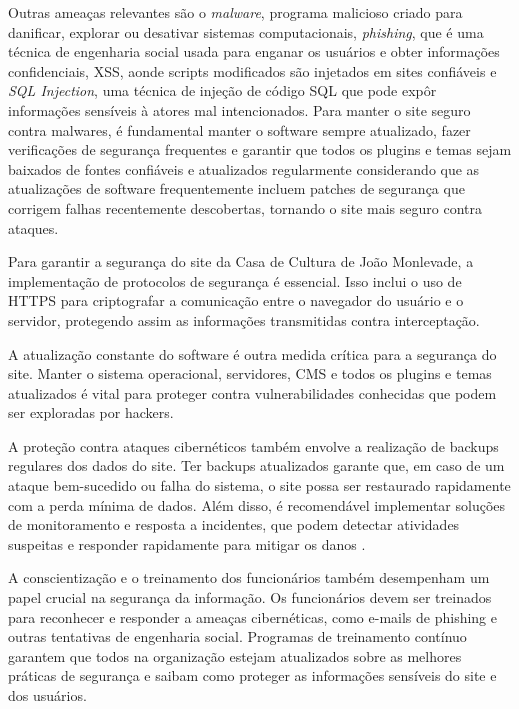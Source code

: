 Outras ameaças relevantes são o \textit{malware}, programa malicioso criado para danificar, explorar ou desativar sistemas computacionais, \textit{phishing}, que é uma técnica de engenharia social usada para enganar os usuários e obter informações confidenciais, \ac{XSS}, aonde scripts modificados são injetados em sites confiáveis e \textit{SQL Injection}, uma técnica de injeção de código \ac{SQL} que pode expôr informações sensíveis à atores mal intencionados. Para manter o site seguro contra malwares, é fundamental manter o software sempre atualizado, fazer verificações de segurança frequentes e garantir que todos os plugins e temas sejam baixados de fontes confiáveis e atualizados regularmente considerando que as atualizações de software frequentemente incluem patches de segurança que corrigem falhas recentemente descobertas, tornando o site mais seguro contra ataques.

Para garantir a segurança do site da Casa de Cultura de João Monlevade, a implementação de protocolos de segurança é essencial. Isso inclui o uso de \ac{HTTPS} para criptografar a comunicação entre o navegador do usuário e o servidor, protegendo assim as informações transmitidas contra interceptação. 

A atualização constante do software é outra medida crítica para a segurança do site. Manter o sistema operacional, servidores, \ac{CMS} e todos os plugins e temas atualizados é vital para proteger contra vulnerabilidades conhecidas que podem ser exploradas por hackers. 

A proteção contra ataques cibernéticos também envolve a realização de backups regulares dos dados do site. Ter backups atualizados garante que, em caso de um ataque bem-sucedido ou falha do sistema, o site possa ser restaurado rapidamente com a perda mínima de dados. Além disso, é recomendável implementar soluções de monitoramento e resposta a incidentes, que podem detectar atividades suspeitas e responder rapidamente para mitigar os danos \cite{baykara2018overview}.

A conscientização e o treinamento dos funcionários também desempenham um papel crucial na segurança da informação. Os funcionários devem ser treinados para reconhecer e responder a ameaças cibernéticas, como e-mails de phishing e outras tentativas de engenharia social. Programas de treinamento contínuo garantem que todos na organização estejam atualizados sobre as melhores práticas de segurança e saibam como proteger as informações sensíveis do site e dos usuários.

